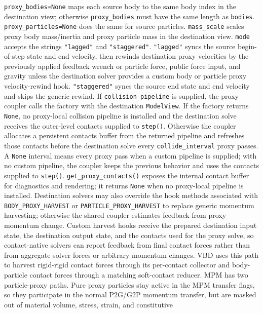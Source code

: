 \documentclass[11pt]{article}
\begin{document}
\texttt{proxy\_bodies=None} maps each source body to the same body index in the
destination view; otherwise \texttt{proxy\_bodies} must have the same length as
\texttt{bodies}. \texttt{proxy\_particles=None} does the same for source particles.
\texttt{mass\_scale} scales proxy body mass/inertia and proxy particle mass in the
destination view. \texttt{mode} accepts the strings \texttt{"lagged"} and
\texttt{"staggered"}. \texttt{"lagged"} syncs the
source begin-of-step state and end velocity, then rewinds destination proxy
velocities by the previously applied feedback wrench or particle force, public
force input, and gravity unless the destination solver provides a custom body or
particle proxy velocity-rewind hook.
\texttt{"staggered"} syncs the source end state and end velocity and skips the
generic rewind. If \texttt{collision\_pipeline} is supplied, the proxy coupler
calls the factory with the destination \texttt{ModelView}. If the factory returns
\texttt{None}, no proxy-local collision pipeline is installed and the destination
solve receives the outer-level contacts supplied to \texttt{step()}. Otherwise
the coupler allocates a persistent contacts buffer from the returned pipeline and
refreshes those contacts before the destination solve every
\texttt{collide\_interval} proxy passes. A \texttt{None} interval means every
proxy pass when a custom pipeline is supplied; with no custom pipeline, the
coupler keeps the previous behavior and uses the contacts supplied to
\texttt{step()}. \texttt{get\_proxy\_contacts()} exposes the internal contact
buffer for diagnostics and rendering; it returns \texttt{None} when no
proxy-local pipeline is installed.
Destination solvers may also override the hook methods associated with
\texttt{BODY\_PROXY\_HARVEST} or \texttt{PARTICLE\_PROXY\_HARVEST} to replace
generic momentum harvesting; otherwise the shared coupler estimates feedback
from proxy momentum change. Custom harvest hooks receive the prepared
destination input state, the destination output state, and the contacts used for
the proxy solve, so contact-native solvers can report feedback from final contact
forces rather than from aggregate solver forces or arbitrary momentum changes.
VBD uses this path to harvest rigid-rigid contact forces through its per-contact
collector and body-particle contact forces through a matching soft-contact
reducer. MPM has two particle-proxy paths. Pure proxy particles stay active in
the MPM transfer flags, so they participate in the normal P2G/G2P momentum
transfer, but are masked out of material volume, stress, strain, and constitutive
\end{document}
